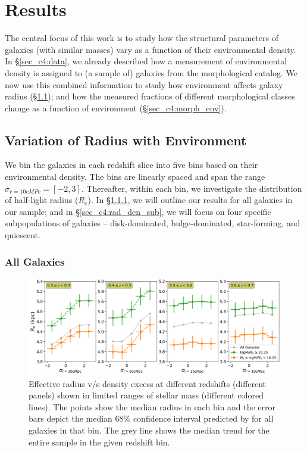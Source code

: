 \section{Results} \label{sec_c4:results}
The central focus of this work is to study how the structural parameters of galaxies (with similar masses) vary as a function of their environmental density. In \S \ref{sec_c4:data}, we already described how a measurement of environmental density is assigned to (a sample of) galaxies from the \citet{hsc_wide_morphs} morphological catalog. We now use this combined information to study how environment affects galaxy radius (\S \ref{sec_c4:rad_den}); and how the measured fractions of different morphological classes change as a function of environment (\S \ref{sec_c4:morph_env}).

\subsection{Variation of Radius with Environment} \label{sec_c4:rad_den}
We bin the galaxies in each redshift slice into five bins based on their environmental density. The bins are linearly spaced and span the range $\sigma_{r=10cMPc} = [-2,3]$. Thereafter, within each bin, we investigate the distribution of half-light radius ($R_e$). In \S \ref{sec_c4:rad_den_all}, we will outline our results for all galaxies in our sample; and in \S \ref{sec_c4:rad_den_sub}, we will focus on four specific subpopulations of galaxies -- disk-dominated, bulge-dominated, star-forming, and quiescent. 

\subsubsection{All Galaxies} \label{sec_c4:rad_den_all}
\begin{figure}[htb]
    \centering
    \includegraphics[width = \textwidth]{rad_den_all.png}
    \caption{Effective radius v/s density excess at different redshifts (different panels) shown in limited ranges of stellar mass (different colored lines). The points show the median radius in each bin and the error bars depict the median $68\%$ confidence interval predicted by \gampen{} for all galaxies in that bin. The grey line shows the median trend for the entire sample in the given redshift bin.}
    \label{fig_c4:rad_den_all}
\end{figure}


